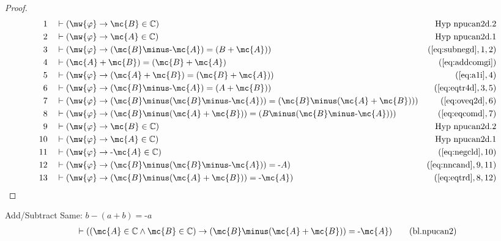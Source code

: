 \begin{proof}
\begin{align}
  1 &&  & \vdash ( \mw{\varphi} \rightarrow \mc{B} \in \mathbb{C}
    )&\text{Hyp~npucan2d.2}\notag%
  \\ 2 &&  & \vdash ( \mw{\varphi} \rightarrow \mc{A} \in \mathbb{C}
    )&\text{Hyp~npucan2d.1}\notag%
  \\ 3 &&  & \vdash ( \mw{\varphi} \rightarrow ( \mc{B} \minus \textrm{-} \mc{A} ) = ( B
    + \mc{A} ) )&(\mbox{\ref{eq:subnegd}},1,2)\notag
  \\ 4 &&  & \vdash ( \mc{A} + \mc{B} ) = ( \mc{B} + \mc{A} )&(\mbox{\ref{eq:addcomgi}})\notag
  \\ 5 &&  & \vdash ( \mw{\varphi} \rightarrow ( \mc{A} + \mc{B} ) = ( \mc{B} + \mc{A} )
    )&(\mbox{\ref{eq:a1i}},4)\notag
  \\ 6 &&  & \vdash ( \mw{\varphi} \rightarrow ( \mc{B} \minus \textrm{-} \mc{A} ) = ( A
    + \mc{B} ) )&(\mbox{\ref{eq:eqtr4d}},3,5)\notag
  \\ 7 &&  & \vdash ( \mw{\varphi} \rightarrow ( \mc{B} \minus ( \mc{B} \minus \textrm{-}
    \mc{A} ) ) = ( \mc{B} \minus ( \mc{A} + \mc{B} ) )
    )&(\mbox{\ref{eq:oveq2d}},6)\notag
  \\ 8 &&  & \vdash ( \mw{\varphi} \rightarrow ( \mc{B} \minus ( \mc{A} + \mc{B} ) ) = ( B
    \minus ( \mc{B} \minus \textrm{-} \mc{A} ) )
    )&(\mbox{\ref{eq:eqcomd}},7)\notag
  \\ 9 &&  & \vdash ( \mw{\varphi} \rightarrow \mc{B} \in \mathbb{C}
    )&\text{Hyp~npucan2d.2}\notag%
  \\ 10 &&  & \vdash ( \mw{\varphi} \rightarrow \mc{A} \in \mathbb{C}
    )&\text{Hyp~npucan2d.1}\notag%
  \\ 11 &&  & \vdash ( \mw{\varphi} \rightarrow \textrm{-} \mc{A} \in \mathbb{C}
    )&(\mbox{\ref{eq:negcld}},10)\notag
  \\ 12 &&  & \vdash ( \mw{\varphi} \rightarrow ( \mc{B} \minus ( \mc{B} \minus
    \textrm{-} \mc{A} ) ) = \textrm{-} A
    )&(\mbox{\ref{eq:nncand}},9,11)\notag
  \\ 13 &&  & \vdash ( \mw{\varphi} \rightarrow ( \mc{B} \minus ( \mc{A} + \mc{B} ) ) =
    \textrm{-} \mc{A} )&(\mbox{\ref{eq:eqtrd}},8,12)\notag
\end{align}
\end{proof}

\begin{lemma} {Add/Subtract Same: $b \minus ( a + b ) =
\textrm{-} a$}
\begin{align}
\vdash ( ( \mc{A} \in \mathbb{C} \wedge \mc{B} \in \mathbb{C} ) \rightarrow ( \mc{B} \minus (
    \mc{A} + \mc{B} ) ) = \textrm{-} \mc{A} )\label{eq:bl.npucan2}\tag{bl.npucan2}
\end{align}
\end{lemma}


